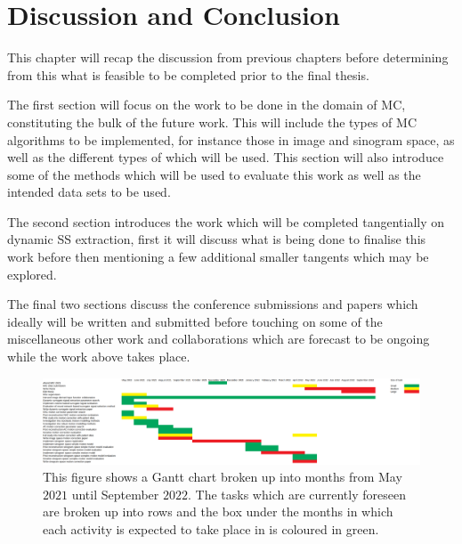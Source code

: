 \chapter{Discussion and Conclusion} \label{sec:discussion_and_conclusion}
    \newpage
    
        This chapter will recap the discussion from previous chapters before determining from this what is feasible to be completed prior to the final thesis.
        
        The first section will focus on the work to be done in the domain of \gls{MC}, constituting the bulk of the future work. This will include the types of \gls{MC} algorithms to be implemented, for instance those in image and sinogram space, as well as the different types of  which will be used. This section will also introduce some of the methods which will be used to evaluate this work as well as the intended data sets to be used.
        
        The second section introduces the work which will be completed tangentially on dynamic \gls{SS} extraction, first it will discuss what is being done to finalise this work before then mentioning a few additional smaller tangents which may be explored.
        
        The final two sections discuss the conference submissions and papers which ideally will be written and submitted before touching on some of the miscellaneous other work and collaborations which are forecast to be ongoing while the work above takes place.
    
        \begin{landscape}
            \begin{figure}
                \centering
                    
                \includegraphics[width=1.0\linewidth]{figures/future_work_gantt_chart.png}
                    
                \captionsetup{singlelinecheck=false, justification=centering}
                \caption{This figure shows a Gantt chart broken up into months from May $2021$ until September $2022$. The tasks which are currently foreseen are broken up into rows and the box under the months in which each activity is expected to take place in is coloured in green.}
                \label{fig:future_work_gantt_chart}
            \end{figure}
        \end{landscape}
        
